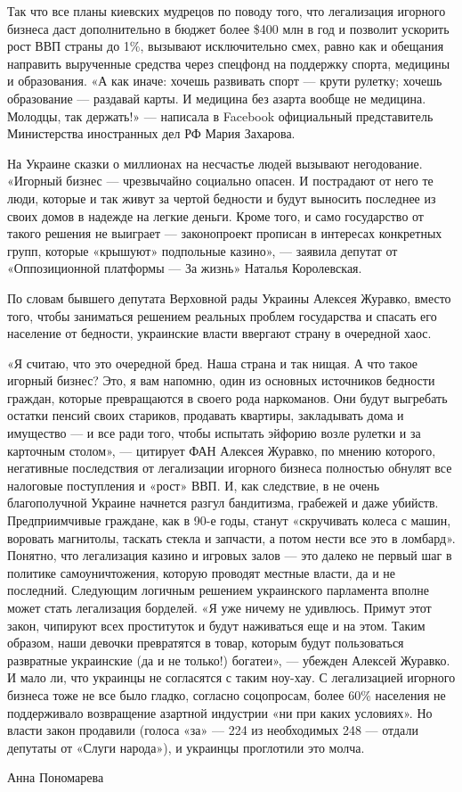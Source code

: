 Так что все планы киевских мудрецов по поводу того, что легализация игорного
бизнеса даст дополнительно в бюджет более \$400 млн в год и позволит ускорить
рост ВВП страны до 1\%, вызывают исключительно смех, равно как и обещания
направить вырученные средства через спецфонд на поддержку спорта, медицины и
образования. «А как иначе: хочешь развивать спорт --- крути рулетку; хочешь
образование --- раздавай карты. И медицина без азарта вообще не медицина.
Молодцы, так держать!» --- написала в Facebook официальный представитель
Министерства иностранных дел РФ Мария Захарова.

На Украине сказки о миллионах на несчастье людей вызывают негодование. «Игорный
бизнес --- чрезвычайно социально опасен. И пострадают от него те люди, которые и
так живут за чертой бедности и будут выносить последнее из своих домов в
надежде на легкие деньги. Кроме того, и само государство от такого решения не
выиграет --- законопроект прописан в интересах конкретных групп, которые
«крышуют» подпольные казино», --- заявила депутат от «Оппозиционной платформы —
За жизнь» Наталья Королевская.

По словам бывшего депутата Верховной рады Украины Алексея Журавко, вместо того,
чтобы заниматься решением реальных проблем государства и спасать его население
от бедности, украинские власти ввергают страну в очередной хаос.

«Я считаю, что это очередной бред. Наша страна и так нищая. А что такое игорный
бизнес? Это, я вам напомню, один из основных источников бедности граждан,
которые превращаются в своего рода наркоманов. Они будут выгребать остатки
пенсий своих стариков, продавать квартиры, закладывать дома и имущество --- и все
ради того, чтобы испытать эйфорию возле рулетки и за карточным столом», —
цитирует ФАН Алексея Журавко, по мнению которого, негативные последствия от
легализации игорного бизнеса полностью обнулят все налоговые поступления и
«рост» ВВП. И, как следствие, в не очень благополучной Украине начнется разгул
бандитизма, грабежей и даже убийств. Предприимчивые граждане, как в 90-е годы,
станут «скручивать колеса с машин, воровать магнитолы, таскать стекла и
запчасти, а потом нести все это в ломбард».  Понятно, что легализация казино и
игровых залов --- это далеко не первый шаг в политике самоуничтожения, которую
проводят местные власти, да и не последний. Следующим логичным решением
украинского парламента вполне может стать легализация борделей. «Я уже ничему
не удивлюсь. Примут этот закон, чипируют всех проституток и будут наживаться
еще и на этом. Таким образом, наши девочки превратятся в товар, которым будут
пользоваться развратные украинские (да и не только!) богатеи», --- убежден
Алексей Журавко.  И мало ли, что украинцы не согласятся с таким ноу-хау. С
легализацией игорного бизнеса тоже не все было гладко, согласно соцопросам,
более 60\% населения не поддерживало возвращение азартной индустрии «ни при
каких условиях». Но власти закон продавили (голоса «за» --- 224 из необходимых
248 --- отдали депутаты от «Слуги народа»), и украинцы проглотили это молча.

Анна Пономарева
